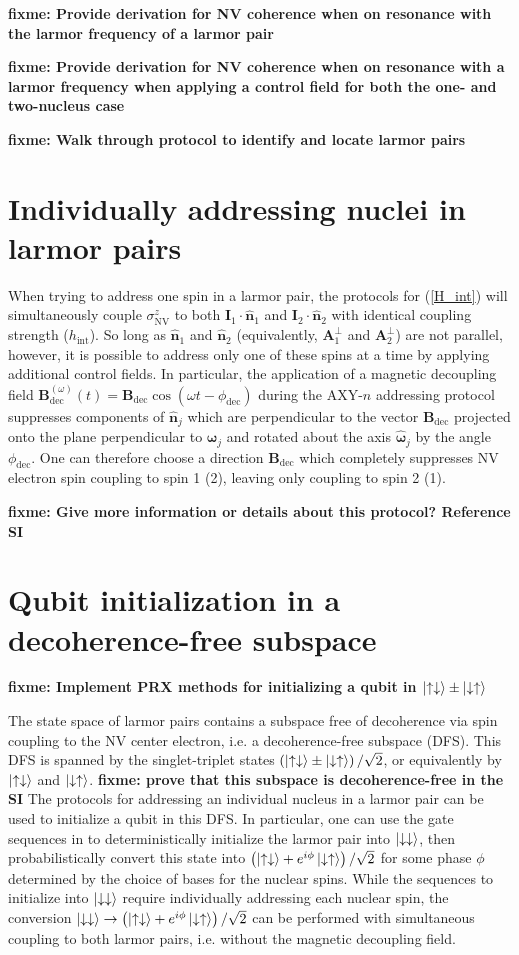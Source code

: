 \documentclass[twocolumn]{revtex4-1}
\renewcommand{\t}{\text} %
\newcommand{\p}[1]{\left(#1\right)} %
\renewcommand{\v}{\bm} %
\newcommand{\uv}[1]{\hat{\v{#1}}} %
\renewcommand{\c}{\cdot} %
\renewcommand{\u}{\uparrow}
\renewcommand{\d}{\downarrow}
\newcommand{\NV}{\t{NV}}
\newcommand{\fixme}[1]{{\bf \color{red} fixme: #1}}
\begin{document}
\fixme{Provide derivation for NV coherence when on resonance with the
  larmor frequency of a larmor pair}

\fixme{Provide derivation for NV coherence when on resonance with a
  larmor frequency when applying a control field for both the one- and
  two-nucleus case}

\fixme{Walk through protocol to identify and locate larmor pairs}

\section{Individually addressing nuclei in larmor pairs}

When trying to address one spin in a larmor pair, the protocols for
(\ref{H_int}) will simultaneously couple $\sigma_\NV^z$ to both
$\v I_1\c\uv n_1$ and $\v I_2\c\uv n_2$ with identical coupling
strength ($h_\t{int}$). So long as $\uv n_1$ and $\uv n_2$
(equivalently, $\v A_1^\perp$ and $\v A_2^\perp$) are not parallel,
however, it is possible to address only one of these spins at a time
by applying additional control fields. In particular, the application
of a magnetic decoupling field
$\v B_\t{dec}^{\p\omega}\p{t}=\v B_\t{dec}\cos\p{\omega
  t-\phi_\t{dec}}$ during the AXY-$n$ addressing protocol suppresses
components of $\uv n_j$ which are perpendicular to the vector
$\v B_\t{dec}$ projected onto the plane perpendicular to $\v\omega_j$
and rotated about the axis $\uv\omega_j$ by the angle
$\phi_\t{dec}$. One can therefore choose a direction $\v B_\t{dec}$
which completely suppresses NV electron spin coupling to spin 1 (2),
leaving only coupling to spin 2 (1).

\fixme{Give more information or details about this protocol? Reference
  SI}

\section{Qubit initialization in a decoherence-free subspace}

\fixme{Implement PRX\cite{reiserer2016robust} methods for initializing
  a qubit in $\ket{\u\d}\pm\ket{\d\u}$}

The state space of larmor pairs contains a subspace free of
decoherence via spin coupling to the NV center electron, i.e. a
decoherence-free subspace (DFS). This DFS is spanned by the
singlet-triplet states $\p{\ket{\u\d}\pm\ket{\d\u}}/\sqrt2$, or
equivalently by $\ket{\u\d}$ and $\ket{\d\u}$. \fixme{prove that this
  subspace is decoherence-free in the SI} The protocols for addressing
an individual nucleus in a larmor pair can be used to initialize a
qubit in this DFS. In particular, one can use the gate sequences in
\cite{reiserer2016robust} to deterministically initialize the larmor
pair into $\ket{\d\d}$, then probabilistically convert this state into
$\p{\ket{\u\d}+e^{i\phi}\ket{\d\u}}/\sqrt2$ for some phase $\phi$
determined by the choice of bases for the nuclear spins. While the
sequences to initialize into $\ket{\d\d}$ require individually
addressing each nuclear spin, the conversion
$\ket{\d\d}\to\p{\ket{\u\d}+e^{i\phi}\ket{\d\u}}/\sqrt2$ can be
performed with simultaneous coupling to both larmor pairs,
i.e. without the magnetic decoupling field.
\end{document}
